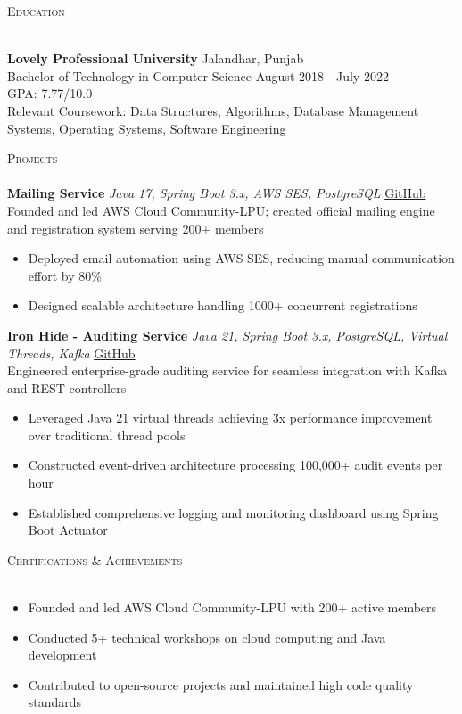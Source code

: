 \documentclass[a4paper]{article}
\newcommand{\lineunder} {
    \vspace*{-8pt} \\
    \hspace*{-18pt} \hrulefill \\
}
\newcommand{\header} [1] {
    {\hspace*{-18pt}\vspace*{6pt} \textsc{#1}}
    \vspace*{-6pt} \lineunder
}
\begin{document}
\header{Education}
\vspace{1mm}

\textbf{Lovely Professional University} \hfill Jalandhar, Punjab\\
Bachelor of Technology in Computer Science \hfill August 2018 - July 2022\\
GPA: 7.77/10.0\\
Relevant Coursework: Data Structures, Algorithms, Database Management Systems, Operating Systems, Software Engineering\\
\vspace{1mm}

\header{Projects}
{\textbf{Mailing Service}} {\sl Java 17, Spring Boot 3.x, AWS SES, PostgreSQL} \hfill \href{https://github.com/AWS-Cloud-Community-LPU/mailing-service}{GitHub}\\
Founded and led AWS Cloud Community-LPU; created official mailing engine and registration system serving 200+ members
\begin{itemize} \itemsep -2pt
    \item Deployed email automation using AWS SES, reducing manual communication effort by 80\%
    \item Designed scalable architecture handling 1000+ concurrent registrations
\end{itemize}
\vspace*{1mm}

{\textbf{Iron Hide - Auditing Service}} {\sl Java 21, Spring Boot 3.x, PostgreSQL, Virtual Threads, Kafka} \hfill \href{https://github.com/garvit-joshi/ironhide}{GitHub}\\
Engineered enterprise-grade auditing service for seamless integration with Kafka and REST controllers
\begin{itemize} \itemsep -2pt
    \item Leveraged Java 21 virtual threads achieving 3x performance improvement over traditional thread pools
    \item Constructed event-driven architecture processing 100,000+ audit events per hour
    \item Established comprehensive logging and monitoring dashboard using Spring Boot Actuator
\end{itemize}
\vspace*{1mm}

\header{Certifications \& Achievements}
\begin{itemize} \itemsep -2pt
    \item Founded and led AWS Cloud Community-LPU with 200+ active members
    \item Conducted 5+ technical workshops on cloud computing and Java development
    \item Contributed to open-source projects and maintained high code quality standards
\end{itemize}

\ 
\end{document}
